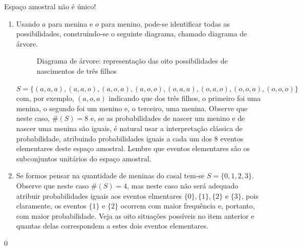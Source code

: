 \begin{answer}{Espaço amostral não é único!}
{
\begin{enumerate}
\item Usando $a$ para menina e $o$ para menino, pode-se identificar todas as possibilidades, construindo-se o seguinte diagrama, chamado diagrama de árvore.

\begin{figure}[H]
\centering
{}
\caption{Diagrama de árvore: representação das oito possibilidades de nascimentos de três filhos}
\end{figure}

{\small$S=\{(a,a,a), (a,a,o), (a,o,a), (a,o,o), (o,a,a), (o,a,o), (o,o,a), (o,o,o)\}$} com, por exemplo, $(a,o,a)$ indicando que dos três filhos, o primeiro foi uma menina, o segundo foi um menino e, o terceiro, uma menina. Observe que neste caso, $\#(S)=8$ e, se as probabilidades de nascer um menino e de nascer uma menina são iguais, é natural usar a interpretação clássica de probabilidade, atribuindo probabilidades iguais a cada um dos 8 eventos elementares deste espaço amostral. Lembre que eventos elementares são os subconjuntos unitários do espaço amostral.

\item Se formos pensar na quantidade de meninas do casal tem-se $S=\{0,1,2,3\}$. Observe que neste caso $\#(S)=4$, mas neste caso não será adequado atribuir probabilidades iguais aos eventos elmentares $\{0\}, \{1\}, \{2\}$ e $\{3\}$, pois claramente, os eventos $\{1\}$ e $\{2\}$ ocorrem com maior frequência e, portanto, com maior probabilidade. Veja as oito situações possíveis no item anterior e quantas delas correspondem a estes dois eventos elementares.
\end{enumerate}
}{0}
\end{answer}
